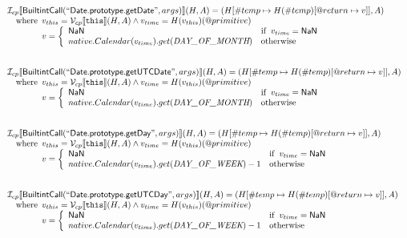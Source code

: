 \documentclass{article}
\newcommand{\SF}[1]{\mbox{\textsf{#1}}}
\newcommand{\TT}[1]{\mbox{\texttt{#1}}}
\newcommand{\wherec}[1]{{\rm where}\begin{array}[t]{l}#1\end{array}}
\newcommand{\ifc}[1]{{\rm if}\begin{array}[t]{l}#1\end{array}}
\newcommand{\owc}{{\rm otherwise}}
\newcommand{\I}{\mathcal{I}}
\newcommand{\V}{\mathcal{V}}
\newcommand{\lbr}{\llbracket}
\newcommand{\rbr}{\rrbracket}
\begin{document}
\[
\begin{array}{l}
\I _{cp}\lbr \SF{BuiltintCall}(``\SF{Date.prototype.getDate}",args)\rbr(H,A)
  = (H[\#temp \mapsto H(\#temp)[@return \mapsto v]], A)\\
\quad\wherec{
  v_{this} = \V _{cp}\lbr \TT{this}\rbr (H,A) \land v_{time} = H(v_{this})(@primitive)\\
  v = \left\{\begin{array}{ll}
    \SF{NaN}  & \ifc{v_{time} = \SF{NaN}}\\
    native.Calendar(v_{time}).get(\emph{DAY\_OF\_MONTH}) & \owc
    \end{array}\right.
  }\\
\\\\

\I _{cp}\lbr \SF{BuiltintCall}(``\SF{Date.prototype.getUTCDate}",args)\rbr(H,A)
  = (H[\#temp \mapsto H(\#temp)[@return \mapsto v]], A)\\
\quad\wherec{
  v_{this} = \V _{cp}\lbr \TT{this}\rbr (H,A) \land v_{time} = H(v_{this})(@primitive)\\
  v = \left\{\begin{array}{ll}
    \SF{NaN}  & \ifc{v_{time} = \SF{NaN}}\\
    native.Calendar(v_{time}).get(\emph{DAY\_OF\_MONTH}) & \owc
    \end{array}\right.
  }\\
\\\\

\I _{cp}\lbr \SF{BuiltintCall}(``\SF{Date.prototype.getDay}",args)\rbr(H,A)
  = (H[\#temp \mapsto H(\#temp)[@return \mapsto v]], A)\\
\quad\wherec{
  v_{this} = \V _{cp}\lbr \TT{this}\rbr (H,A) \land v_{time} = H(v_{this})(@primitive)\\
  v = \left\{\begin{array}{ll}
    \SF{NaN}  & \ifc{v_{time} = \SF{NaN}}\\
    native.Calendar(v_{time}).get(\emph{DAY\_OF\_WEEK}) -1 & \owc
    \end{array}\right.
  }\\
\\\\

\I _{cp}\lbr \SF{BuiltintCall}(``\SF{Date.prototype.getUTCDay}",args)\rbr(H,A)
  = (H[\#temp \mapsto H(\#temp)[@return \mapsto v]], A)\\
\quad\wherec{
  v_{this} = \V _{cp}\lbr \TT{this}\rbr (H,A) \land v_{time} = H(v_{this})(@primitive)\\
  v = \left\{\begin{array}{ll}
    \SF{NaN}  & \ifc{v_{time} = \SF{NaN}}\\
    native.Calendar(v_{time}).get(\emph{DAY\_OF\_WEEK}) -1& \owc
    \end{array}\right.
  }\\
\\\\


\end{array}\]
\end{document}
